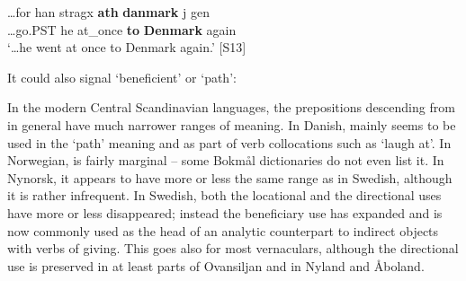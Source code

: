 {%

\ea\label{}
\gll …for  han  stragx  \textbf{ath} \textbf{danmark} j gen\\
…go.PST  he  at\_once  \textbf{to} \textbf{Denmark} again\\
\glt ‘…he went at once to Denmark again.’ [S13]
\z

It could also signal ‘beneficient’ or ‘path’:


\ea\label{}

\z 
\z

In the modern Central Scandinavian languages, the prepositions descending from  in general have much narrower ranges of meaning. In Danish, mainly seems to be used in the ‘path’ meaning and as part of verb collocations such as  ‘laugh at’. In Norwegian,  is fairly marginal – some Bokmål dictionaries do not even list it. In Nynorsk, it appears to have more or less the same range as in Swedish, although it is rather infrequent. In Swedish, both the locational and the directional uses have more or less disappeared; instead the beneficiary use has expanded and is now commonly used as the head of an analytic counterpart to indirect objects with verbs of giving. This goes also for most vernaculars, although the directional use is preserved in at least parts of Ovansiljan and in Nyland and Åboland. 


}

